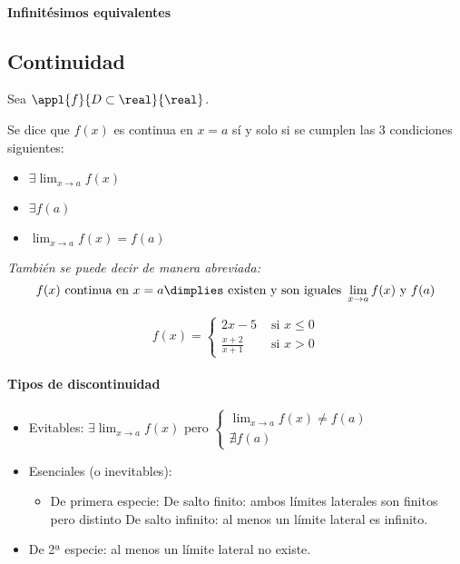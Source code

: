 \begin{example}

\end{example}

\paragraph{Infinitésimos equivalentes}

\subsection{Continuidad}

\begin{defn}
Sea $\appl{f}{D\subset\real}{\real}$.

Se dice que $f(x)$ es continua en $x=a$ sí y solo si se cumplen las 3 condiciones siguientes:
\begin{itemize}
	\item $\exists \lim_{x\to a} f(x)$
	\item $\exists f(a)$
	\item $\lim_{x\to a}f(x) = f(a)$
\end{itemize}

\textit{También se puede decir de manera abreviada: \[f(x) \text{ continua en } x=a\dimplies \text{ existen y son iguales } \lim_{x\to a}f(x) \text{ y } f(a)\]}
\end{defn}

\begin{example}
\[f(x) = 
	\begin{cases}
		2x-5 & \text{ si }x\leq 0\\ 
		\frac{x+2}{x+1} & \text{ si } x>0
	\end{cases}\]
\end{example}

\paragraph{Tipos de discontinuidad}

\begin{itemize}
	\item Evitables: $\exists \lim_{x\to a}f(x)$ pero $\begin{cases}\lim_{x\to a}f(x) \neq f(a)\\\nexists f(a)\end{cases}$
	\item Esenciales (o inevitables): 
	\begin{itemize}
		\item De primera especie:
		\subitem De salto finito: ambos límites laterales son finitos pero distinto
		\subitem De salto infinito: al menos un límite lateral es infinito.
	\end{itemize}
	\item De 2ª especie: al menos un límite lateral no existe.
\end{itemize}

